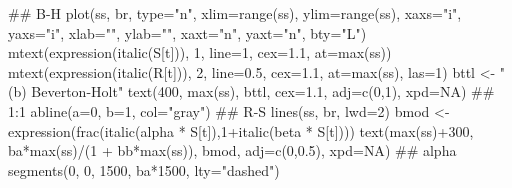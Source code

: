 \documentclass[11pt,]{article}
\newenvironment{Shaded}{}{}
\newcommand{\KeywordTok}[1]{\textcolor[rgb]{0.00,0.00,1.00}{#1}}
\newcommand{\DataTypeTok}[1]{#1}
\newcommand{\DecValTok}[1]{#1}
\newcommand{\FloatTok}[1]{#1}
\newcommand{\StringTok}[1]{\textcolor[rgb]{0.00,0.50,0.50}{#1}}
\newcommand{\OtherTok}[1]{\textcolor[rgb]{1.00,0.25,0.00}{#1}}
\newcommand{\OperatorTok}[1]{#1}
\newcommand{\NormalTok}[1]{#1}
\begin{document}
\begin{Shaded}
\begin{Highlighting}[]
\NormalTok{## B-H}
\KeywordTok{plot}\NormalTok{(ss, br, }\DataTypeTok{type=}\StringTok{"n"}\NormalTok{, }\DataTypeTok{xlim=}\KeywordTok{range}\NormalTok{(ss), }\DataTypeTok{ylim=}\KeywordTok{range}\NormalTok{(ss), }\DataTypeTok{xaxs=}\StringTok{"i"}\NormalTok{, }\DataTypeTok{yaxs=}\StringTok{"i"}\NormalTok{,}
     \DataTypeTok{xlab=}\StringTok{""}\NormalTok{, }\DataTypeTok{ylab=}\StringTok{""}\NormalTok{, }\DataTypeTok{xaxt=}\StringTok{"n"}\NormalTok{, }\DataTypeTok{yaxt=}\StringTok{"n"}\NormalTok{, }\DataTypeTok{bty=}\StringTok{"L"}\NormalTok{)}
\KeywordTok{mtext}\NormalTok{(}\KeywordTok{expression}\NormalTok{(}\KeywordTok{italic}\NormalTok{(S[t])), }\DecValTok{1}\NormalTok{, }\DataTypeTok{line=}\DecValTok{1}\NormalTok{, }\DataTypeTok{cex=}\FloatTok{1.1}\NormalTok{, }\DataTypeTok{at=}\KeywordTok{max}\NormalTok{(ss))}
\KeywordTok{mtext}\NormalTok{(}\KeywordTok{expression}\NormalTok{(}\KeywordTok{italic}\NormalTok{(R[t])), }\DecValTok{2}\NormalTok{, }\DataTypeTok{line=}\FloatTok{0.5}\NormalTok{, }\DataTypeTok{cex=}\FloatTok{1.1}\NormalTok{, }\DataTypeTok{at=}\KeywordTok{max}\NormalTok{(ss), }\DataTypeTok{las=}\DecValTok{1}\NormalTok{)}
\NormalTok{bttl <-}\StringTok{ "(b) Beverton-Holt"}
\KeywordTok{text}\NormalTok{(}\DecValTok{400}\NormalTok{, }\KeywordTok{max}\NormalTok{(ss), bttl, }\DataTypeTok{cex=}\FloatTok{1.1}\NormalTok{, }\DataTypeTok{adj=}\KeywordTok{c}\NormalTok{(}\DecValTok{0}\NormalTok{,}\DecValTok{1}\NormalTok{), }\DataTypeTok{xpd=}\OtherTok{NA}\NormalTok{)}
\NormalTok{## 1:1}
\KeywordTok{abline}\NormalTok{(}\DataTypeTok{a=}\DecValTok{0}\NormalTok{, }\DataTypeTok{b=}\DecValTok{1}\NormalTok{, }\DataTypeTok{col=}\StringTok{"gray"}\NormalTok{)}
\NormalTok{## R-S}
\KeywordTok{lines}\NormalTok{(ss, br, }\DataTypeTok{lwd=}\DecValTok{2}\NormalTok{)}
\NormalTok{bmod <-}\StringTok{ }\KeywordTok{expression}\NormalTok{(}\KeywordTok{frac}\NormalTok{(}\KeywordTok{italic}\NormalTok{(alpha }\OperatorTok{*}\StringTok{ }\NormalTok{S[t]),}\DecValTok{1}\OperatorTok{+}\KeywordTok{italic}\NormalTok{(beta }\OperatorTok{*}\StringTok{ }\NormalTok{S[t])))}
\KeywordTok{text}\NormalTok{(}\KeywordTok{max}\NormalTok{(ss)}\OperatorTok{+}\DecValTok{300}\NormalTok{, ba}\OperatorTok{*}\KeywordTok{max}\NormalTok{(ss)}\OperatorTok{/}\NormalTok{(}\DecValTok{1} \OperatorTok{+}\StringTok{ }\NormalTok{bb}\OperatorTok{*}\KeywordTok{max}\NormalTok{(ss)), bmod, }\DataTypeTok{adj=}\KeywordTok{c}\NormalTok{(}\DecValTok{0}\NormalTok{,}\FloatTok{0.5}\NormalTok{), }\DataTypeTok{xpd=}\OtherTok{NA}\NormalTok{)}
\NormalTok{## alpha}
\KeywordTok{segments}\NormalTok{(}\DecValTok{0}\NormalTok{, }\DecValTok{0}\NormalTok{, }\DecValTok{1500}\NormalTok{, ba}\OperatorTok{*}\DecValTok{1500}\NormalTok{, }\DataTypeTok{lty=}\StringTok{"dashed"}\NormalTok{)}

\end{Highlighting}
\end{Shaded}
\end{document}
